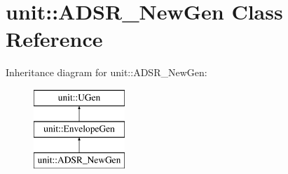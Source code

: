 \hypertarget{classunit_1_1ADSR__NewGen}{}\section{unit\+:\+:A\+D\+S\+R\+\_\+\+New\+Gen Class Reference}
\label{classunit_1_1ADSR__NewGen}
Inheritance diagram for unit\+:\+:A\+D\+S\+R\+\_\+\+New\+Gen\+:\begin{figure}[H]
\begin{center}
\leavevmode
\includegraphics[height=3.000000cm]{classunit_1_1ADSR__NewGen}
\end{center}
\end{figure}
